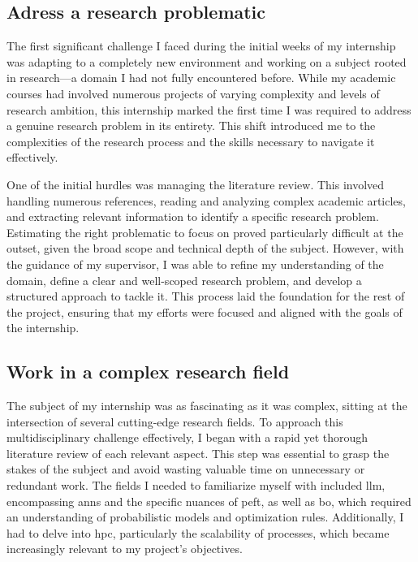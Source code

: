 \subsection{Adress a research problematic}
\label{sec:adress_research}
The first significant challenge I faced during the initial weeks of my internship was adapting to a completely new environment and working on a subject rooted in research—a domain I had not fully encountered before. While my academic courses had involved numerous projects of varying complexity and levels of research ambition, this internship marked the first time I was required to address a genuine research problem in its entirety. This shift introduced me to the complexities of the research process and the skills necessary to navigate it effectively.

One of the initial hurdles was managing the literature review. This involved handling numerous references, reading and analyzing complex academic articles, and extracting relevant information to identify a specific research problem. Estimating the right problematic to focus on proved particularly difficult at the outset, given the broad scope and technical depth of the subject. However, with the guidance of my supervisor, I was able to refine my understanding of the domain, define a clear and well-scoped research problem, and develop a structured approach to tackle it. This process laid the foundation for the rest of the project, ensuring that my efforts were focused and aligned with the goals of the internship.


\subsection{Work in a complex research field}
\label{sec:complex_field}
The subject of my internship was as fascinating as it was complex, sitting at the intersection of several cutting-edge research fields. To approach this multidisciplinary challenge effectively, I began with a rapid yet thorough literature review of each relevant aspect. This step was essential to grasp the stakes of the subject and avoid wasting valuable time on unnecessary or redundant work. The fields I needed to familiarize myself with included \acrshort{llm}, encompassing \acrshort{ann}s and the specific nuances of \acrlong{peft}, as well as \acrlong{bo}, which required an understanding of probabilistic models and optimization rules. Additionally, I had to delve into \acrfull{hpc}, particularly the scalability of processes, which became increasingly relevant to my project’s objectives.

